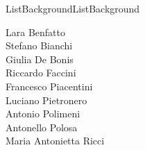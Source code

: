 \begin{fsmbox}{6cm}{ListBackground}{ListBackground}
\begin{minipage}{4.7cm}
Lara Benfatto\\
Stefano Bianchi\\
Giulia De Bonis\\
Riccardo Faccini\\
Francesco Piacentini\\
Luciano Pietronero\\
Antonio Polimeni\\
Antonello Polosa\\
Maria Antonietta Ricci
\end{minipage}
\end{fsmbox}
